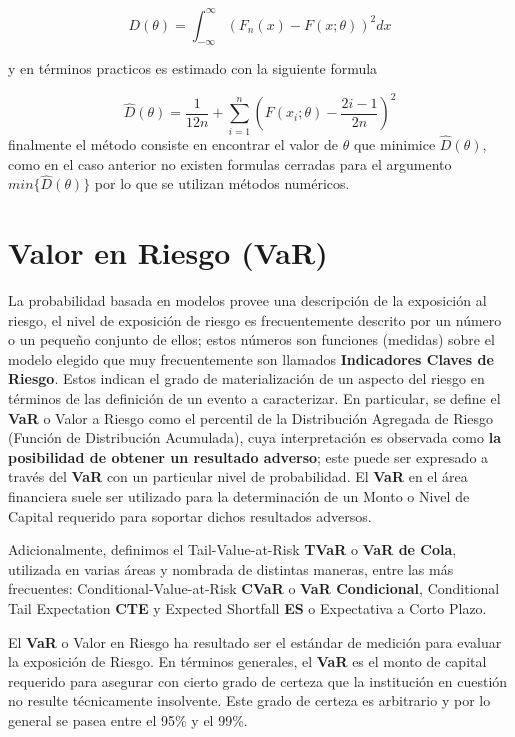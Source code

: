 \documentclass[]{article}
\begin{document}
\[D(\theta)=\int_{-\infty}^{\infty}(F_n(x)-F(x;\theta))^2dx\]

y en términos practicos es estimado con la siguiente formula

\[\hat{D}(\theta)=\frac{1}{12n}+\sum_{i=1}^{n}\left(F(x_i ;\theta)-\frac{2i-1}{2n}\right)^2\]
finalmente el método consiste en encontrar el valor de \(\theta\) que
minimice \(\hat{D}(\theta)\), como en el caso anterior no existen
formulas cerradas para el argumento \(min\{\hat{D}(\theta)\}\) por lo
que se utilizan métodos numéricos.

\hypertarget{valor-en-riesgo-var}{%
\section{Valor en Riesgo (VaR)}\label{valor-en-riesgo-var}}

La probabilidad basada en modelos provee una descripción de la
exposición al riesgo, el nivel de exposición de riesgo es frecuentemente
descrito por un número o un pequeño conjunto de ellos; estos números son
funciones (medidas) sobre el modelo elegido que muy frecuentemente son
llamados \textbf{Indicadores Claves de Riesgo}. Estos indican el grado
de materialización de un aspecto del riesgo en términos de las
definición de un evento a caracterizar. En particular, se define el
\textbf{VaR} o Valor a Riesgo como el percentil de la Distribución
Agregada de Riesgo (Función de Distribución Acumulada), cuya
interpretación es observada como \textbf{la posibilidad de obtener un
resultado adverso}; este puede ser expresado a través del \textbf{VaR}
con un particular nivel de probabilidad. El \textbf{VaR} en el área
financiera suele ser utilizado para la determinación de un Monto o Nivel
de Capital requerido para soportar dichos resultados adversos.

Adicionalmente, definimos el Tail-Value-at-Risk \textbf{TVaR} o
\textbf{VaR de Cola}, utilizada en varias áreas y nombrada de distintas
maneras, entre las más frecuentes: Conditional-Value-at-Risk
\textbf{CVaR} o \textbf{VaR Condicional}, Conditional Tail Expectation
\textbf{CTE} y Expected Shortfall \textbf{ES} o Expectativa a Corto
Plazo.

El \textbf{VaR} o Valor en Riesgo ha resultado ser el estándar de
medición para evaluar la exposición de Riesgo. En términos generales, el
\textbf{VaR} es el monto de capital requerido para asegurar con cierto
grado de certeza que la institución en cuestión no resulte técnicamente
insolvente. Este grado de certeza es arbitrario y por lo general se
pasea entre el 95\% y el 99\%.
\end{document}
